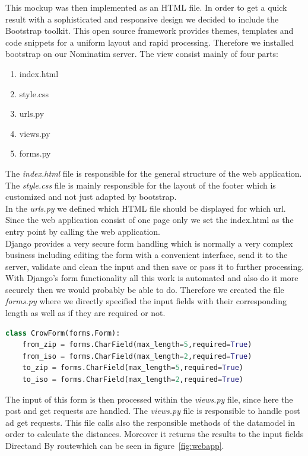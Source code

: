 This mockup was then implemented as an HTML file. In order to get a quick result with a sophisticated and responsive design we decided to include the Bootstrap toolkit. This open source framework provides themes, templates and code snippets for a uniform layout and rapid processing. Therefore we installed bootstrap on our Nominatim server.
The view consist mainly of four parts:
\begin{enumerate}
\item index.html
\item style.css
\item urls.py
\item views.py
\item forms.py
\end{enumerate}
The \emph{index.html} file is responsible for the general structure of the web application. The \emph{style.css} file is mainly responsible for the layout of the footer which is customized and not just adapted by bootstrap. \\
In the \emph{urls.py} we defined which HTML file should be displayed for which url. Since the web application consist of one page only we set the index.html as the entry point by calling the web application. \\
Django provides a very secure form handling which is normally a very complex business including editing the form with a convenient interface, send it to the server, validate and clean the input and then save or pass it to further processing. With Django's form functionality all this work is automated and also do it more securely then we would probably be able to do.
Therefore we created the file \emph{forms.py} where we directly specified the input fields with their corresponding length as well as if they are required or not.
\begin{lstlisting}[language=python,breaklines=true]
class CrowForm(forms.Form):
    from_zip = forms.CharField(max_length=5,required=True)
    from_iso = forms.CharField(max_length=2,required=True)
    to_zip = forms.CharField(max_length=5,required=True)
    to_iso = forms.CharField(max_length=2,required=True)
    \end{lstlisting}
The input of this form is then processed within the \emph{views.py} file, since here the post and get requests are handled.
The \emph{views.py} file is responsible to handle post ad get requests.
This file calls also the responsible methods of the datamodel in order to calculate the distances.
Moreover it returns the results to the input fields \glqq Direct\grqq and \glqq By route\grqq which can be seen in figure~\ref{fig:webapp}.

